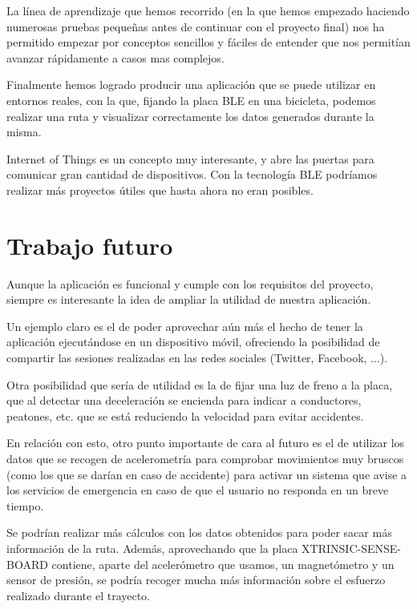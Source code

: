 La línea de aprendizaje que hemos recorrido (en la que hemos empezado haciendo numerosas pruebas pequeñas antes de continuar con el proyecto final) nos ha permitido empezar por conceptos sencillos y fáciles de entender que nos permitían avanzar rápidamente a casos mas complejos.

Finalmente hemos logrado producir una aplicación que se puede utilizar en entornos reales, con la que, fijando la placa BLE en una bicicleta, podemos realizar una ruta y visualizar correctamente los datos generados durante la misma.

Internet of Things es un concepto muy interesante, y abre las puertas para comunicar gran cantidad de dispositivos. Con la tecnología BLE podríamos realizar más proyectos útiles que hasta ahora no eran posibles.

\section{Trabajo futuro}

Aunque la aplicación es funcional y cumple con los requisitos del proyecto, siempre es interesante la idea de ampliar la utilidad de nuestra aplicación.

Un ejemplo claro es el de poder aprovechar aún más el hecho de tener la aplicación ejecutándose en un dispositivo móvil, ofreciendo la posibilidad de compartir las sesiones realizadas en las redes sociales (Twitter, Facebook, ...).

Otra posibilidad que sería de utilidad es la de fijar una luz de freno a la placa, que al detectar una deceleración se encienda para indicar a conductores, peatones, etc. que se está reduciendo la velocidad para evitar accidentes.

En relación con esto, otro punto importante de cara al futuro es el de utilizar los datos que se recogen de acelerometría para comprobar movimientos muy bruscos (como los que se darían en caso de accidente) para activar un sistema que avise a los servicios de emergencia en caso de que el usuario no responda en un breve tiempo.

Se podrían realizar más cálculos con los datos obtenidos para poder sacar más información de la ruta. Además, aprovechando que la placa XTRINSIC-SENSE-BOARD contiene, aparte del acelerómetro que usamos, un magnetómetro y un sensor de presión, se podría recoger mucha más información sobre el esfuerzo realizado durante el trayecto.

